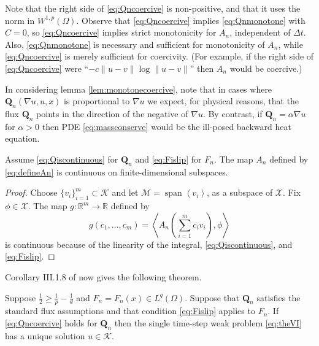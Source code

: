 \documentclass[final,leqno,onefignum,onetabnum]{siamltex1213bueler}
\newcommand\bQ{\mathbf{Q}}
\renewcommand{\grad}{\nabla}
\newcommand{\ip}[2]{\ensuremath{\left<#1,#2\right>}}
\newcommand\RR{\mathbb{R}}
\begin{document}
Note that the right side of \eqref{eq:Qncoercive} is non-positive, and that it uses the norm in $W^{1,p}(\Omega)$.  Observe that \eqref{eq:Qncoercive} implies \eqref{eq:Qnmonotone} with $C=0$, so \eqref{eq:Qncoercive} implies strict monotonicity for $A_n$, independent of $\Delta t$.  Also, \eqref{eq:Qnmonotone} is necessary and sufficient for monotonicity of $A_n$, while \eqref{eq:Qncoercive} is merely sufficient for coercivity.  (For example, if the right side of \eqref{eq:Qncoercive} were ``$- c \|u-v\| \log \|u-v\|$'' then $A_n$ would be coercive.)

In considering lemma \ref{lem:monotonecoercive}, note that in cases where $\bQ_n(\grad u,u,x)$ is proportional to $\grad u$ we expect, for physical reasons, that the flux $\bQ_n$ points in the direction of the negative of $\grad u$.  By contrast, if $\bQ_n = \alpha \grad u$ for $\alpha>0$ then PDE \eqref{eq:massconserve} would be the ill-posed backward heat equation.

\medskip
\begin{lemma}  \label{lem:continuous}  Assume \eqref{eq:Qiscontinuous} for $\bQ_n$ and \eqref{eq:Fislip} for $F_n$.  The map $A_n$ defined by \eqref{eq:defineAn} is continuous on finite-dimensional subspaces.
\end{lemma}

\begin{proof} Choose $\{v_i\}_{i=1}^m \subset \mathcal{K}$ and let $\mathcal{M}=\operatorname{span}\left<v_i\right>$, as a subspace of $\mathcal{X}$.  Fix $\phi\in\mathcal{X}$.  The map $g:\RR^m \to \RR$ defined by
\begin{equation}
  g(c_1,\dots,c_m) = \ip{A_n\left(\sum_{i=1}^m c_i v_i\right)}{\phi}
\end{equation}
is continuous because of the linearity of the integral, \eqref{eq:Qiscontinuous}, and \eqref{eq:Fislip}.
\end{proof}

\medskip
Corollary III.1.8 of \cite{KinderlehrerStampacchia1980} now gives the following theorem.

\medskip
\begin{theorem}  \label{thm:monowellposed}  Suppose $\frac{1}{2} \ge \frac{1}{p} - \frac{1}{d}$ and $F_n=F_n(x)\in L^q(\Omega)$.  Suppose that $\bQ_n$ satisfies the standard flux assumptions and that condition \eqref{eq:Fislip} applies to $F_n$.  If \eqref{eq:Qncoercive} holds for $\bQ_n$ then the single time-step weak problem \eqref{eq:theVI} has a unique solution $u\in\mathcal{K}$.
\end{theorem}
\end{document}
